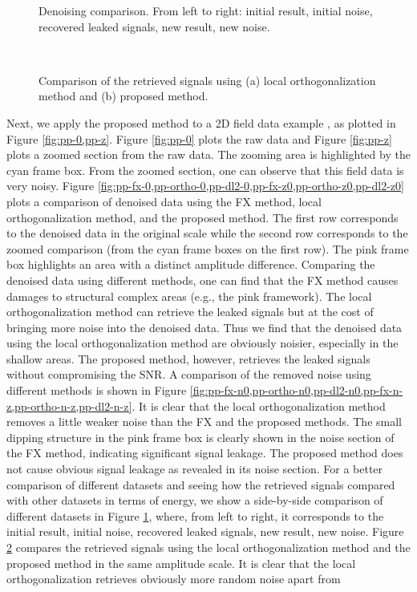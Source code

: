 {\begin{figure}[htb!]
\centering
{}
\caption{Denoising comparison. From left to right: initial result, initial noise, recovered leaked signals, new result, new noise.}
\label{fig:pp-comp2}
\end{figure}

\begin{figure}[htb!]
\centering
{}\\
\caption{Comparison of the retrieved signals using (a) local orthogonalization method and (b) proposed method. }
\label{fig:pp-reo-0,pp-re2-0}
\end{figure}
}
Next, we apply the proposed method to a 2D field data example , as plotted in Figure \ref{fig:pp-0,pp-z}. Figure \ref{fig:pp-0} plots the raw data and Figure \ref{fig:pp-z} plots a zoomed section from the raw data. The zooming area is highlighted by the cyan frame box. From the zoomed section, one can observe that this field data is very noisy. Figure \ref{fig:pp-fx-0,pp-ortho-0,pp-dl2-0,pp-fx-z0,pp-ortho-z0,pp-dl2-z0} plots a comparison of denoised data using the FX method, local orthogonalization method, and the proposed method. The first row corresponds to the denoised data in the original scale while the second row corresponds to the zoomed comparison (from the cyan frame boxes on the first row). The pink frame box highlights an area with a distinct amplitude difference. Comparing the denoised data using different methods, one can find that the FX method causes damages to structural complex areas (e.g., the pink framework). The local orthogonalization method can retrieve the leaked signals but at the cost of bringing more noise into the denoised data. Thus we find that the denoised data using the local orthogonalization method are obviously noisier, especially in the shallow areas. The proposed method, however, retrieves the leaked signals without compromising the SNR. A comparison of the removed noise using different methods is shown in Figure \ref{fig:pp-fx-n0,pp-ortho-n0,pp-dl2-n0,pp-fx-n-z,pp-ortho-n-z,pp-dl2-n-z}. It is clear that the local orthogonalization method removes a little weaker noise than the FX and the proposed methods. The small dipping structure in the pink frame box is clearly shown in the noise section of the FX method, indicating significant signal leakage. The proposed method does not cause obvious signal leakage as revealed in its noise section. For a better comparison of different datasets and seeing how the retrieved signals compared with other datasets in terms of energy, we show a side-by-side comparison of different datasets in Figure \ref{fig:pp-comp2}, where, from left to right, it corresponds to the initial result, initial noise, recovered leaked signals, new result, new noise. Figure \ref{fig:pp-reo-0,pp-re2-0} compares the retrieved signals using the local orthogonalization method and the proposed method in the same amplitude scale. It is clear that the local orthogonalization retrieves obviously more random noise apart from 
